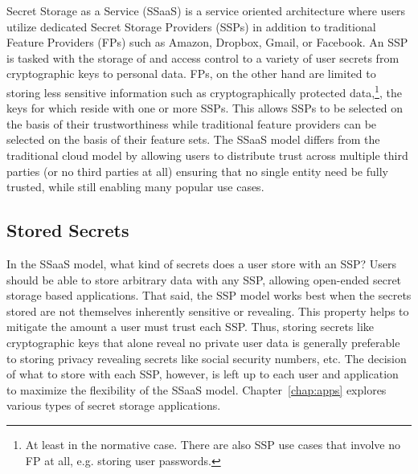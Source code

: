 Secret Storage as a Service (SSaaS) is a service oriented architecture
where users utilize dedicated Secret Storage Providers (SSPs) in
addition to traditional Feature Providers (FPs) such as Amazon,
Dropbox, Gmail, or Facebook. An SSP is tasked with the storage of and
access control to a variety of user secrets from cryptographic keys to
personal data. FPs, on the other hand are limited to storing less
sensitive information such as cryptographically protected
data,\footnote{At least in the normative case. There are also SSP use
  cases that involve no FP at all, e.g. storing user passwords.}, the
keys for which reside with one or more SSPs. This allows SSPs to be
selected on the basis of their trustworthiness while traditional
feature providers can be selected on the basis of their feature
sets. The SSaaS model differs from the traditional cloud model by
allowing users to distribute trust across multiple third parties (or
no third parties at all) ensuring that no single entity need be fully
trusted, while still enabling many popular use cases.

\subsection{Stored Secrets}

In the SSaaS model, what kind of secrets does a user store with an
SSP? Users should be able to store arbitrary data with any SSP,
allowing open-ended secret storage based applications. That said, the
SSP model works best when the secrets stored are not themselves
inherently sensitive or revealing. This property helps to mitigate the
amount a user must trust each SSP. Thus, storing secrets like
cryptographic keys that alone reveal no private user data is generally
preferable to storing privacy revealing secrets like social security
numbers, etc. The decision of what to store with each SSP, however, is
left up to each user and application to maximize the flexibility of
the SSaaS model. Chapter~\ref{chap:apps} explores various types of
secret storage applications.

